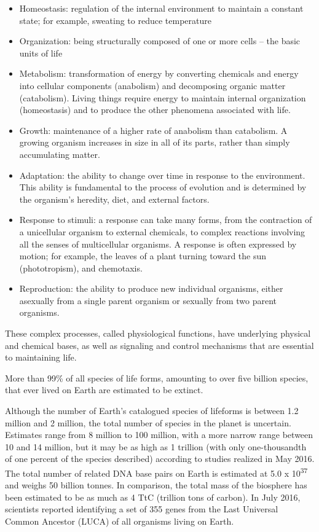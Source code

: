 \begin{itemize}
\tightlist
\item
  Homeostasis: regulation of the internal environment to maintain a constant state; for example, sweating to reduce temperature
\item
  Organization: being structurally composed of one or more cells -- the basic units of life
\item
  Metabolism: transformation of energy by converting chemicals and energy into cellular components (anabolism) and decomposing organic matter (catabolism). Living things require energy to maintain internal organization (homeostasis) and to produce the other phenomena associated with life.
\item
  Growth: maintenance of a higher rate of anabolism than catabolism. A growing organism increases in size in all of its parts, rather than simply accumulating matter.
\item
  Adaptation: the ability to change over time in response to the environment. This ability is fundamental to the process of evolution and is determined by the organism's heredity, diet, and external factors.
\item
  Response to stimuli: a response can take many forms, from the contraction of a unicellular organism to external chemicals, to complex reactions involving all the senses of multicellular organisms. A response is often expressed by motion; for example, the leaves of a plant turning toward the sun (phototropism), and chemotaxis.
\item
  Reproduction: the ability to produce new individual organisms, either asexually from a single parent organism or sexually from two parent organisms.
\end{itemize}

These complex processes, called physiological functions, have underlying physical and chemical bases, as well as signaling and control mechanisms that are essential to maintaining life.

More than 99\% of all species of life forms, amounting to over five billion species, that ever lived on Earth are estimated to be extinct.

Although the number of Earth's catalogued species of lifeforms is between 1.2 million and 2 million, the total number of species in the planet is uncertain. Estimates range from 8 million to 100 million, with a more narrow range between 10 and 14 million, but it may be as high as 1 trillion (with only one-thousandth of one percent of the species described) according to studies realized in May 2016. The total number of related DNA base pairs on Earth is estimated at 5.0 x 10\textsuperscript{37} and weighs 50 billion tonnes. In comparison, the total mass of the biosphere has been estimated to be as much as 4 TtC (trillion tons of carbon). In July 2016, scientists reported identifying a set of 355 genes from the Last Universal Common Ancestor (LUCA) of all organisms living on Earth.

